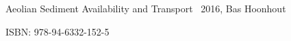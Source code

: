 \thispagestyle{empty}

\hfill

\vfill

\noindent Aeolian Sediment Availability and Transport \textcopyright\ 2016, Bas Hoonhout



\bigskip

\noindent ISBN: 978-94-6332-152-5

